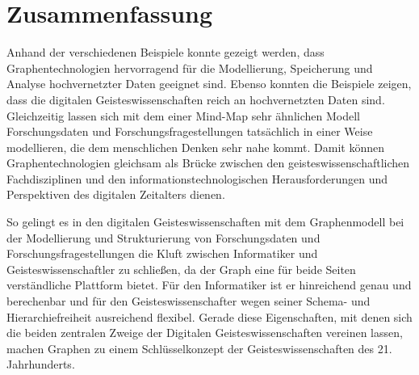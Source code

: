 \documentclass[ngerman,]{scrreprt}
\begin{document}
\hypertarget{zusammenfassung-4}{%
\chapter{Zusammenfassung}\label{zusammenfassung-4}}

Anhand der verschiedenen Beispiele konnte gezeigt werden, dass Graphentechnologien hervorragend für die Modellierung, Speicherung und Analyse hochvernetzter Daten geeignet sind. Ebenso konnten die Beispiele zeigen, dass die digitalen Geisteswissenschaften reich an hochvernetzten Daten sind. Gleichzeitig lassen sich mit dem einer Mind-Map sehr ähnlichen Modell Forschungsdaten und Forschungsfragestellungen tatsächlich in einer Weise modellieren, die dem menschlichen Denken sehr nahe kommt. Damit können Graphentechnologien gleichsam als Brücke zwischen den geisteswissenschaftlichen Fachdisziplinen und den informationstechnologischen Herausforderungen und Perspektiven des digitalen Zeitalters dienen.

So gelingt es in den digitalen Geisteswissenschaften mit dem Graphenmodell bei der Modellierung und Strukturierung von Forschungsdaten und Forschungsfragestellungen die Kluft zwischen Informatiker und Geisteswissenschaftler zu schließen, da der Graph eine für beide Seiten verständliche Plattform bietet. Für den Informatiker ist er hinreichend genau und berechenbar und für den Geisteswissenschafter wegen seiner Schema- und Hierarchiefreiheit ausreichend flexibel. Gerade diese Eigenschaften, mit denen sich die beiden zentralen Zweige der Digitalen Geisteswissenschaften vereinen lassen, machen Graphen zu einem Schlüsselkonzept der Geisteswissenschaften des 21. Jahrhunderts.
\end{document}
